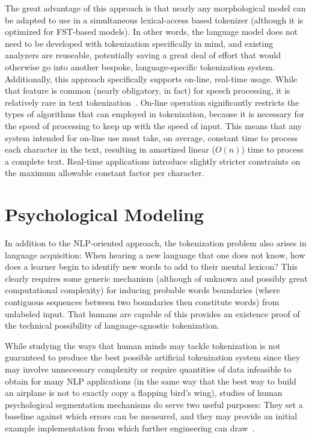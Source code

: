 The great advantage of this approach is that nearly any morphological model can be adapted to use in a simultaneous lexical-access based tokenizer (although it is optimized for FST-based models). In other words, the language model does not need to be developed with tokenization specifically in mind, and existing analyzers are reuseable, potentially saving a great deal of effort that would otherwise go into another bespoke, language-specific tokenization system. Additionally, this approach specifically supports on-line, real-time usage. While that feature is common (nearly obligatory, in fact) for speech processing, it is relatively rare in text tokenization~\cite{aken11}. On-line operation significantly restricts the types of algorithms that can employed in tokenization, because it is necessary for the speed of processing to keep up with the speed of input. This means that any system intended for on-line use must take, on average, constant time to process each character in the text, resulting in amortized linear ($O(n)$) time to process a complete text. Real-time applications introduce slightly stricter constraints on the maximum allowable constant factor per character.


\section{Psychological Modeling}

In addition to the NLP-oriented approach, the tokenization problem also arises in language acquisition: When hearing a new language that one does not know, how does a learner begin to identify new words to add to their mental lexicon? This clearly requires some generic mechanism (although of unknown and possibly great computational complexity) for inducing probable words boundaries (where contiguous sequences between two boundaries then constitute words) from unlabeled input. That humans are capable of this provides an existence proof of the technical possibility of language-agnostic tokenization.

While studying the ways that human minds may tackle tokenization is not guaranteed to produce the best possible artificial tokenization system since they may involve unnecessary complexity or require quantities of data infeasible to obtain for many NLP applications (in the same way that the best way to build an airplane is not to exactly copy a flapping bird's wing), studies of human psychological segmentation mechanisms do serve two useful purposes: They set a baseline against which errors can be measured, and they may provide an initial example implementation from which further engineering can draw~\cite{daland09}.

